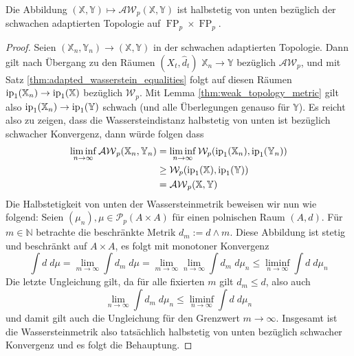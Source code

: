 \begin{corollary}%
    Die Abbildung $(\mathbb{X,Y}) \mapsto \mathcal{AW}_p(\mathbb{X,Y})$ ist halbstetig von unten bezüglich der schwachen adaptierten Topologie auf $\operatorname{FP}_p\times \operatorname{FP}_p$.
\end{corollary}
\begin{proof}
    Seien $(\mathbb{X}_n, \mathbb{Y}_n) \rightarrow (\mathbb{X,Y})$ in der schwachen adaptierten Topologie. Dann gilt nach Übergang zu den Räumen $(X_t, \widehat{d}_t)$ $\mathbb{X}_n \rightarrow \mathbb{Y}$ bezüglich $\mathcal{AW}_p$, und mit Satz \ref{thm:adapted_wasserstein_equalities} folgt auf diesen Räumen $\operatorname{ip}_1(\mathbb{X}_n) \rightarrow \operatorname{ip}_1(\mathbb{X})$ bezüglich $\mathcal{W}_p$. Mit Lemma \ref{thm:weak_topology_metric} gilt also $\operatorname{ip}_1(\mathbb{X}_n) \rightarrow \operatorname{ip}_1(\mathbb{Y})$ schwach (und alle Überlegungen genauso für $\mathbb{Y}$). Es reicht also zu zeigen, dass die Wassersteindistanz halbstetig von unten ist bezüglich schwacher Konvergenz, dann würde folgen dass
    \begin{align*}
        \liminf_{n\rightarrow\infty} \mathcal{AW}_p(\mathbb{X}_n,\mathbb{Y}_n) &= \liminf_{n\rightarrow\infty} \mathcal{W}_p(\operatorname{ip}_1(\mathbb{X}_n), \operatorname{ip}_1(\mathbb{Y}_n)) \\
        &\geq \mathcal{W}_p(\operatorname{ip}_1(\mathbb{X}), \operatorname{ip}_1(\mathbb{Y})) \\
        &= \mathcal{AW}_p(\mathbb{X}, \mathbb{Y})
    \end{align*}
    Die Halbstetigkeit von unten der Wassersteinmetrik beweisen wir nun wie folgend: Seien $(\mu_n), \mu \in \mathcal{P}_p(A\times A)$ für einen polnischen Raum $(A, d)$. Für $m \in \mathbb{N}$ betrachte die beschränkte Metrik $d_m := d \wedge m$. Diese Abbildung ist stetig und beschränkt auf $A \times A$, es folgt mit monotoner Konvergenz
    $$\int d \;d\mu = \lim_{m\rightarrow \infty} \int d_m \;d\mu = \lim_{m\rightarrow\infty}\lim_{n\rightarrow\infty}\int d_m \;d\mu_n \leq \liminf_{n\rightarrow\infty} \int d \;d\mu_n$$
    Die letzte Ungleichung gilt, da für alle fixierten $m$ gilt $d_m\leq d$, also auch 
    $$\lim_{n\rightarrow\infty} \int d_m \; d\mu_n \leq \liminf_{n\rightarrow\infty} \int d \; d\mu_n$$
    und damit gilt auch die Ungleichung für den Grenzwert $m\rightarrow \infty$. Insgesamt ist die Wassersteinmetrik also tatsächlich halbstetig von unten bezüglich schwacher Konvergenz und es folgt die Behauptung.
\end{proof}